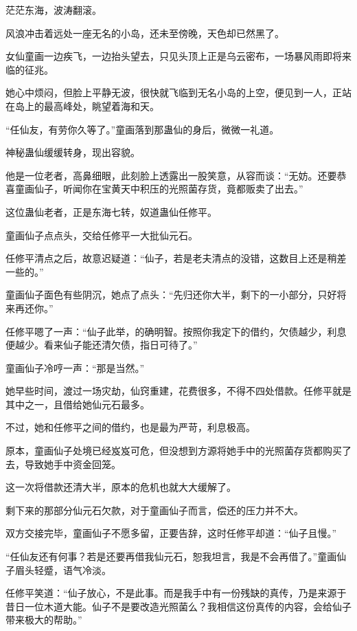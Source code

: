 
\begin{this_body}

茫茫东海，波涛翻滚。

风浪冲击着远处一座无名的小岛，还未至傍晚，天色却已然黑了。

女仙童画一边疾飞，一边抬头望去，只见头顶上正是乌云密布，一场暴风雨即将来临的征兆。

她心中烦闷，但脸上平静无波，很快就飞临到无名小岛的上空，便见到一人，正站在岛上的最高峰处，眺望着海和天。

“任仙友，有劳你久等了。”童画落到那蛊仙的身后，微微一礼道。

神秘蛊仙缓缓转身，现出容貌。

他是一位老者，高鼻细眼，此刻脸上透露出一股笑意，从容而谈：“无妨。还要恭喜童画仙子，听闻你在宝黄天中积压的光照菌存货，竟都贩卖了出去。”

这位蛊仙老者，正是东海七转，奴道蛊仙任修平。

童画仙子点点头，交给任修平一大批仙元石。

任修平清点之后，故意迟疑道：“仙子，若是老夫清点的没错，这数目上还是稍差一些的。”

童画仙子面色有些阴沉，她点了点头：“先归还你大半，剩下的一小部分，只好将来再还你。”

任修平嗯了一声：“仙子此举，的确明智。按照你我定下的借约，欠债越少，利息便越少。看来仙子能还清欠债，指日可待了。”

童画仙子冷哼一声：“那是当然。”

她早些时间，渡过一场灾劫，仙窍重建，花费很多，不得不四处借款。任修平就是其中之一，且借给她仙元石最多。

不过，她和任修平之间的借约，也是最为严苛，利息极高。

原本，童画仙子处境已经岌岌可危，但没想到方源将她手中的光照菌存货都购买了去，导致她手中资金回笼。

这一次将借款还清大半，原本的危机也就大大缓解了。

剩下来的那部分仙元石欠款，对于童画仙子而言，偿还的压力并不大。

双方交接完毕，童画仙子不愿多留，正要告辞，这时任修平却道：“仙子且慢。”

“任仙友还有何事？若是还要再借我仙元石，恕我坦言，我是不会再借了。”童画仙子眉头轻蹙，语气冷淡。

任修平笑道：“仙子放心，不是此事。而是我手中有一份残缺的真传，乃是来源于昔日一位木道大能。仙子不是要改造光照菌么？我相信这份真传的内容，会给仙子带来极大的帮助。”


\end{this_body}

